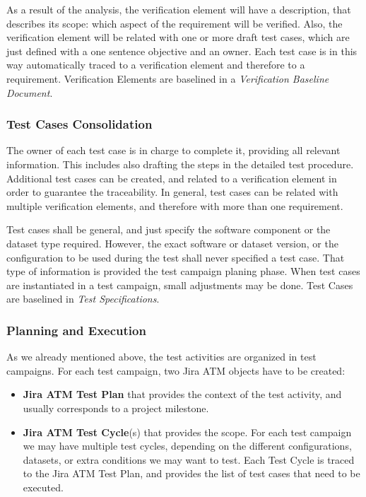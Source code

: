 As a result of the analysis, the verification element will have a description, that describes its scope: which aspect of the requirement will be verified.
Also, the verification element will be related with one or more draft test cases, which are just defined with a one sentence objective and an owner.
Each test case is in this way automatically traced to a verification element and therefore to a requirement.
Verification Elements are baselined in a \textit{Verification Baseline Document}.

\subsubsection{Test Cases Consolidation}

The owner of each test case is in charge to complete it, providing all relevant information. 
This includes also drafting the steps in the detailed test procedure.
Additional test cases can be created, and related to a verification element in order to guarantee the traceability.
In general, test cases can be related with multiple verification elements, and therefore with more than one requirement.

Test cases shall be general, and just specify the software component or the dataset type required. 
However, the exact software or dataset version, or the configuration to be used during the test shall never specified a test case. 
That type of information is provided the test campaign planing phase.
When test cases are instantiated in a test campaign, small adjustments may be done.
Test Cases are baselined in \textit{Test Specifications}.

\subsubsection{Planning and Execution}

As we already mentioned above, the test activities are organized in test campaigns.
For each test campaign, two Jira ATM objects have to be created:

\begin{itemize}
\item \textbf{Jira ATM Test Plan} that provides the context of the test activity, and usually corresponds to a project milestone.
\item \textbf{Jira ATM Test Cycle}(s) that provides the scope. For each test campaign we may have multiple test cycles, 
depending on the different configurations, datasets, or extra conditions we may want to test. Each Test Cycle is traced
to the Jira ATM Test Plan, and provides the list of test cases that need to be executed.
\end{itemize}

